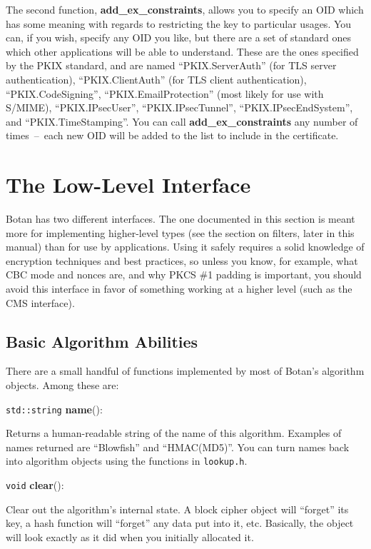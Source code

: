 \documentclass{article}
\newcommand{\filename}[1]{\texttt{#1}}
\newcommand{\function}[1]{\textbf{#1}}
\newcommand{\type}[1]{\texttt{#1}}
\begin{document}
The second function, \function{add\_ex\_constraints}, allows you to specify an
OID which has some meaning with regards to restricting the key to particular
usages. You can, if you wish, specify any OID you like, but there are a set of
standard ones which other applications will be able to understand. These are
the ones specified by the PKIX standard, and are named ``PKIX.ServerAuth'' (for
TLS server authentication), ``PKIX.ClientAuth'' (for TLS client
authentication), ``PKIX.CodeSigning'', ``PKIX.EmailProtection'' (most likely
for use with S/MIME), ``PKIX.IPsecUser'', ``PKIX.IPsecTunnel'',
``PKIX.IPsecEndSystem'', and ``PKIX.TimeStamping''. You can call
\function{add\_ex\_constraints} any number of times~--~each new OID will be
added to the list to include in the certificate.

\pagebreak
\section{The Low-Level Interface}

Botan has two different interfaces. The one documented in this section is meant
more for implementing higher-level types (see the section on filters, later in
this manual) than for use by applications. Using it safely requires a solid
knowledge of encryption techniques and best practices, so unless you know, for
example, what CBC mode and nonces are, and why PKCS \#1 padding is important,
you should avoid this interface in favor of something working at a higher level
(such as the CMS interface).

\subsection{Basic Algorithm Abilities}

There are a small handful of functions implemented by most of Botan's
algorithm objects. Among these are:

\noindent
\type{std::string} \function{name}():

Returns a human-readable string of the name of this algorithm. Examples of
names returned are ``Blowfish'' and ``HMAC(MD5)''. You can turn names back into
algorithm objects using the functions in \filename{lookup.h}.

\noindent
\type{void} \function{clear}():

Clear out the algorithm's internal state. A block cipher object will ``forget''
its key, a hash function will ``forget'' any data put into it, etc. Basically,
the object will look exactly as it did when you initially allocated it.
\end{document}
